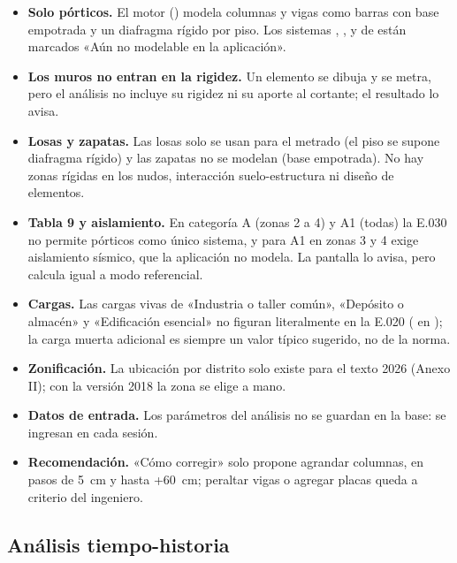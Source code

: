 \begin{itemize}
	\item \textbf{Solo pórticos.} El motor () modela columnas y vigas como barras
	      con base empotrada y un diafragma rígido por piso. Los sistemas , ,
	       y  de  están marcados «Aún no
	      modelable en la aplicación».
	\item \textbf{Los muros no entran en la rigidez.} Un elemento  se dibuja y se metra, pero el análisis no
	      incluye su rigidez ni su aporte al cortante; el resultado lo avisa.
	\item \textbf{Losas y zapatas.} Las losas solo se usan para el metrado (el piso se supone diafragma rígido) y las
	      zapatas no se modelan (base empotrada). No hay zonas rígidas en los nudos, interacción suelo-estructura ni diseño
	      de elementos.
	\item \textbf{Tabla 9 y aislamiento.} En categoría A (zonas 2 a 4) y A1 (todas) la E.030 no permite pórticos como
	      único sistema, y para A1 en zonas 3 y 4 exige aislamiento sísmico, que la aplicación no modela. La pantalla lo
	      avisa, pero calcula igual a modo referencial.
	\item \textbf{Cargas.} Las cargas vivas de «Industria o taller común», «Depósito o almacén» y «Edificación esencial»
	      no figuran literalmente en la E.020 ( en ); la carga muerta
	      adicional es siempre un valor típico sugerido, no de la norma.
	\item \textbf{Zonificación.} La ubicación por distrito solo existe para el texto 2026 (Anexo II); con la versión 2018
	      la zona se elige a mano.
	\item \textbf{Datos de entrada.} Los parámetros del análisis no se guardan en la base: se ingresan en cada sesión.
	\item \textbf{Recomendación.} «Cómo corregir» solo propone agrandar columnas, en pasos de 5~cm y hasta +60~cm;
	      peraltar vigas o agregar placas queda a criterio del ingeniero.
\end{itemize}

\subsection{Análisis tiempo-historia}

